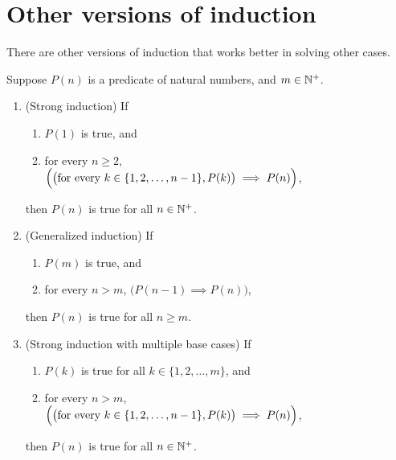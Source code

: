 \documentclass[../MATH-2000-Notes.tex]{subfiles}
\begin{document}
\section{Other versions of induction}
There are other versions of induction that works better in solving other cases.
\begin{Proposition}
    {}
    \label{pr-OtherInduct}
    \renewcommand{\theenumii}{\roman{enumii}}
    \makeatletter\renewcommand{\p@enumii}{}\makeatother
    Suppose $P(n)$ is a predicate of natural numbers, and $m \in \mathbb{N}^+$.
    \begin{enumerate}
        \item \label{pr-OtherInduct-strong}
              {\rm(Strong induction)}
              If
              \begin{enumerate}
                  \item \label{InductionStrong-base} $P(1)$ is true,
                        and
                  \item \label{InductionStrong-step}
                        for every $ n \ge 2$,
                        \\ \hbox{\qquad} $\Bigl( \bigl( \mbox{for every } k \in \{1,2,\ldots,n-1\}, P(k) \bigr) \implies P(n) \Bigr)$,
              \end{enumerate}
              then $P(n)$ is true for all $n \in \mathbb{N}^+$.

        \item \label{pr-OtherInduct-Gen}
              {\rm(Generalized induction)}
              If
              \begin{enumerate}
                  \item \label{InductionGen-base} $P(m)$ is true,
                        and
                  \item \label{InductionGen-step}
                        for every $ n > m$, $\bigl( P(n-1)  \implies P(n) \bigr)$,
              \end{enumerate}
              then $P(n)$ is true for all $n \ge m$.

        \item \label{pr-OtherInduct-multiple}
              {\rm(Strong induction with multiple base cases)}
              If
              \begin{enumerate}
                  \item \label{InductionMultiple-base} $P(k)$ is true for all $k \in \{1,2,\ldots,m\}$,
                        and
                  \item \label{InductionMultiple-step}
                        for every $ n > m$,
                        \\ \hbox{\qquad} $\Bigl( \bigl( \mbox{for every } k \in \{1,2,\ldots,n-1\}, P(k) \bigr) \implies P(n) \Bigr)$,
              \end{enumerate}
              then $P(n)$ is true for all $n \in \mathbb{N}^+$.


\end{enumerate}
\end{Proposition}
\end{document}
